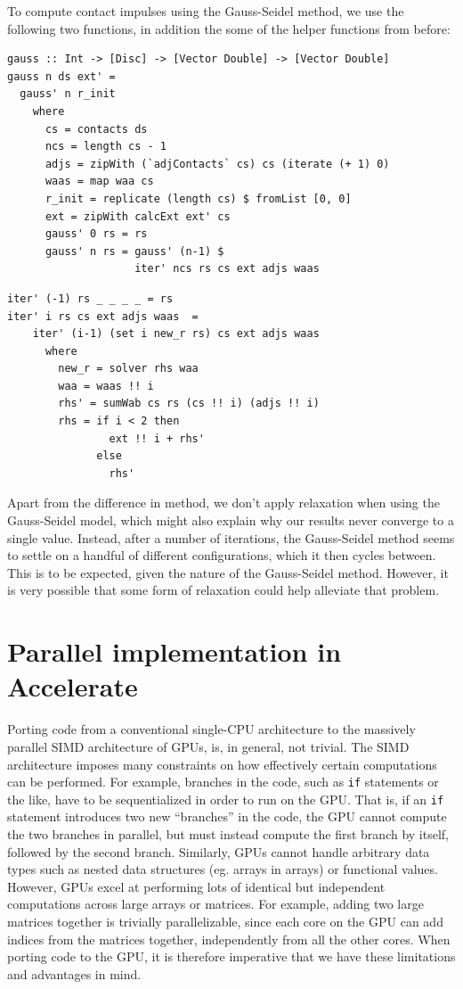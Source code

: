 \documentclass[runningheads,a4paper]{llncs}
\begin{document}
To compute contact impulses using the Gauss-Seidel method, we use the following
two functions, in addition the some of the helper functions from before:
\begin{verbatim}
gauss :: Int -> [Disc] -> [Vector Double] -> [Vector Double]
gauss n ds ext' =
  gauss' n r_init
    where
      cs = contacts ds
      ncs = length cs - 1
      adjs = zipWith (`adjContacts` cs) cs (iterate (+ 1) 0)
      waas = map waa cs
      r_init = replicate (length cs) $ fromList [0, 0]
      ext = zipWith calcExt ext' cs
      gauss' 0 rs = rs
      gauss' n rs = gauss' (n-1) $
                    iter' ncs rs cs ext adjs waas
\end{verbatim}
\begin{verbatim}
iter' (-1) rs _ _ _ _ = rs
iter' i rs cs ext adjs waas  =
    iter' (i-1) (set i new_r rs) cs ext adjs waas
      where
        new_r = solver rhs waa
        waa = waas !! i
        rhs' = sumWab cs rs (cs !! i) (adjs !! i)
        rhs = if i < 2 then
                ext !! i + rhs'
              else
                rhs'
\end{verbatim}
Apart from the difference in method, we don't apply relaxation when using the
Gauss-Seidel model, which might also explain why our results never converge to
a single value. Instead, after a number of iterations, the Gauss-Seidel method
seems to settle on a handful of different configurations, which it then cycles
between. This is to be expected, given the nature of the Gauss-Seidel
method. However, it is very possible that some form of relaxation could help
alleviate that problem.

\section{Parallel implementation in Accelerate}
Porting code from a conventional single-CPU architecture to the massively
parallel SIMD architecture of GPUs, is, in general, not trivial. The SIMD
architecture imposes many constraints on how effectively certain computations
can be performed. For example, branches in the code, such as \verb+if+
statements or the like, have to be sequentialized in order to run on the
GPU. That is, if an \verb+if+ statement introduces two new ``branches'' in the
code, the GPU cannot compute the two branches in parallel, but must instead
compute the first branch by itself, followed by the second branch. Similarly,
GPUs cannot handle arbitrary data types such as nested data structures
(eg. arrays in arrays) or functional values. However, GPUs excel at performing
lots of identical but independent computations across large arrays or
matrices. For example, adding two large matrices together is trivially
parallelizable, since each core on the GPU can add indices from the matrices
together, independently from all the other cores. When porting code to the GPU,
it is therefore imperative that we have these limitations and advantages in
mind.
\end{document}
